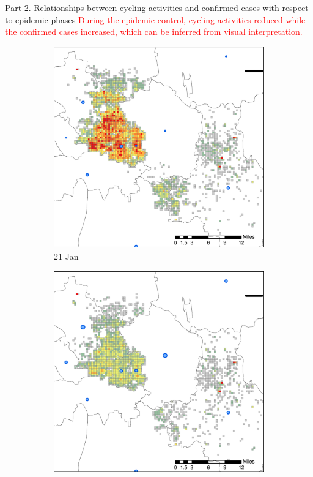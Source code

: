 \documentclass[preprints,ijgi,submit,moreauthors]{Definitions/mdpi}
\begin{document}
Part 2. Relationships between cycling activities and confirmed cases with respect to epidemic phases
\textcolor{red}{During the epidemic control, cycling activities reduced while the confirmed cases increased, which can be inferred from visual interpretation.}
\begin{figure}[H]
    \centering
    \begin{subfigure}{.3\textwidth}
        \includegraphics[width=\textwidth]{Figures/Figure7/NewDistrictSSBD2020_01_21.eps}
        \caption{21 Jan}
    \end{subfigure}
    \begin{subfigure}{.3\textwidth}
        \includegraphics[width=\textwidth]{Figures/Figure7/NewDistrictSSBD2020_01_25.eps}

\end{subfigure}
\end{figure}
\end{document}
